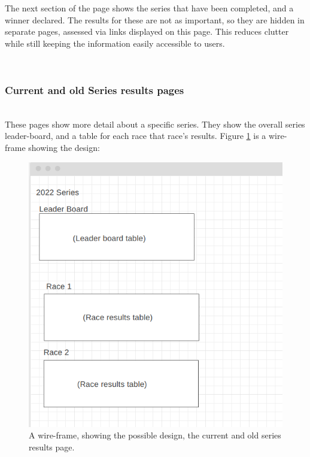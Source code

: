 \documentclass{l4proj}
\begin{document}
The next section of the page shows the series that have been completed, and a winner declared. The results for these are not as important, so they are hidden in separate pages, assessed via links displayed on this page. This reduces clutter while still keeping the information easily accessible to users.

\hfill\\
\subsubsection{Current and old Series results pages}
\hfill\\
These pages show more detail about a specific series. They show the overall series leader-board, and a table for each race that race’s results. Figure \ref{fig:detailsWF} is a wire-frame showing the design:

\begin{figure}[h!]
    \centering
    \includegraphics[width=1\linewidth]{images/moreDetailWireframe.png} 

    \caption{A wire-frame, showing the possible design, the current and old series results page.
    }

    \label{fig:detailsWF}
\end{figure}
\end{document}
